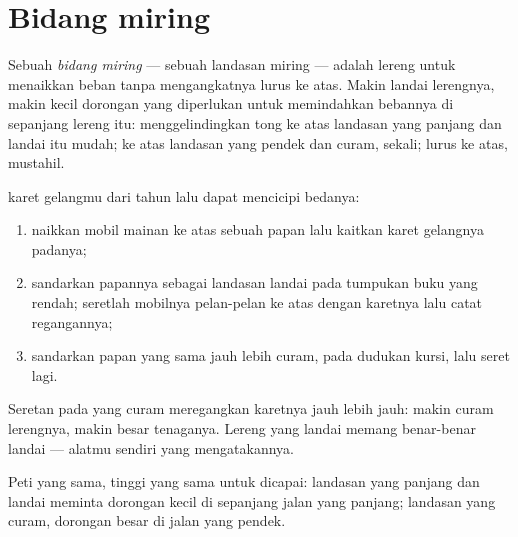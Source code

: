 \section{Bidang miring}

\begin{definition}\label{def:g5:simple-machines:ramp}
Sebuah \emph{bidang miring} --- sebuah landasan
miring --- adalah lereng untuk menaikkan beban tanpa mengangkatnya
lurus ke atas. Makin landai lerengnya, makin kecil dorongan yang
diperlukan untuk memindahkan bebannya di sepanjang lereng itu:
menggelindingkan tong ke atas landasan yang panjang dan landai itu
mudah; ke atas landasan yang pendek dan curam,  sekali; lurus ke
atas, mustahil.
\end{definition}

\begin{method}\label{met:g5:simple-machines:measure}
 karet gelangmu dari tahun lalu dapat mencicipi bedanya:
\begin{enumerate}
  \item naikkan mobil mainan ke atas sebuah papan lalu kaitkan karet
        gelangnya padanya;
  \item sandarkan papannya sebagai landasan landai pada tumpukan buku
        yang rendah; seretlah mobilnya pelan-pelan ke atas dengan
        karetnya lalu catat regangannya;
  \item sandarkan papan yang sama jauh lebih curam, pada dudukan
        kursi, lalu seret lagi.
\end{enumerate}
Seretan pada yang curam meregangkan karetnya jauh lebih jauh: makin
curam lerengnya, makin besar tenaganya. Lereng yang landai memang
benar-benar landai --- alatmu sendiri yang mengatakannya.
\end{method}

\begin{omfigure}

{\small Peti yang sama, tinggi yang sama untuk dicapai: landasan yang
panjang dan landai meminta dorongan kecil di sepanjang jalan yang
panjang; landasan yang curam, dorongan besar di jalan yang pendek.}
\end{omfigure}

